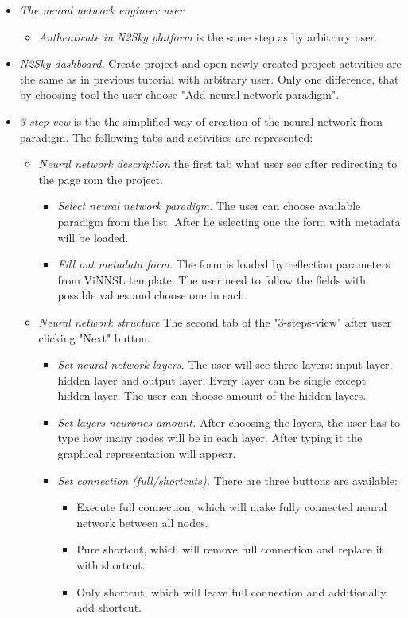 \begin{itemize}
\item \emph{The neural network engineer user} 
\begin{itemize}
\item \emph{Authenticate in N2Sky platform} is the same step as by arbitrary user.
\end{itemize}
\item \emph{N2Sky dashboard.} Create project and open newly created project activities are the same as in previous tutorial with arbitrary user. Only one difference, that by choosing tool the user choose "Add neural network paradigm".  
\item \emph{3-step-vew} is the the simplified way of creation of the neural network from paradigm. The following tabs and activities are represented:
\begin{itemize}
\item \emph{Neural network description} the first  tab what user see after redirecting to the page rom the project. 
\begin{itemize}
\item \emph{Select neural network paradigm.} The user can choose available paradigm from the list. After he selecting one the form with metadata will be loaded.
\item \emph{Fill out metadata form.} The form is loaded by reflection parameters from ViNNSL template. The user need to follow the fields with possible values and choose one in each. 
\end{itemize}
\item \emph{Neural network structure} The second tab of the "3-steps-view" after user clicking "Next" button.
\begin{itemize}
\item \emph{Set neural network layers.} The user will see three layers: input layer, hidden layer and output layer. Every layer can be single except hidden layer. The user can choose amount of the hidden layers.
\item \emph{Set layers neurones amount.} After choosing the layers, the user has to type how many nodes will be in each layer. After typing it the graphical representation will appear.
\item \emph{Set connection (full/shortcuts).} There are three buttons are available: 
\begin{itemize}
\item Execute full connection, which will make fully connected neural network between all nodes.
\item Pure shortcut, which will remove full connection and replace it with shortcut.
\item Only shortcut, which will leave full connection and additionally add shortcut.
\end{itemize}


\end{itemize}
\end{itemize}
\end{itemize}
